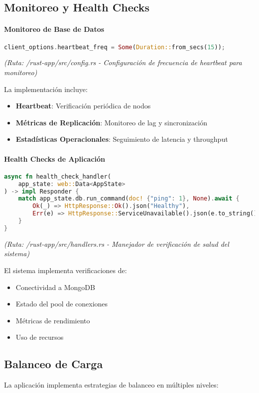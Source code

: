 \documentclass[12pt,letterpaper]{article}
\begin{document}
\subsection{Monitoreo y Health Checks}
\paragraph{Monitoreo de Base de Datos}
\begin{lstlisting}[language=rust]
client_options.heartbeat_freq = Some(Duration::from_secs(15));
\end{lstlisting}
\textit{(Ruta: /rust-app/src/config.rs - Configuración de frecuencia de heartbeat para monitoreo)}

La implementación incluye:
\begin{itemize}
    \item \textbf{Heartbeat}: Verificación periódica de nodos
    \item \textbf{Métricas de Replicación}: Monitoreo de lag y sincronización
    \item \textbf{Estadísticas Operacionales}: Seguimiento de latencia y throughput
\end{itemize}

\paragraph{Health Checks de Aplicación}
\begin{lstlisting}[language=rust]
async fn health_check_handler(
    app_state: web::Data<AppState>
) -> impl Responder {
    match app_state.db.run_command(doc! {"ping": 1}, None).await {
        Ok(_) => HttpResponse::Ok().json("Healthy"),
        Err(e) => HttpResponse::ServiceUnavailable().json(e.to_string())
    }
}
\end{lstlisting}
\textit{(Ruta: /rust-app/src/handlers.rs - Manejador de verificación de salud del sistema)}

El sistema implementa verificaciones de:
\begin{itemize}
    \item Conectividad a MongoDB
    \item Estado del pool de conexiones
    \item Métricas de rendimiento
    \item Uso de recursos
\end{itemize}

\subsection{Balanceo de Carga}
La aplicación implementa estrategias de balanceo en múltiples niveles:
\end{document}
